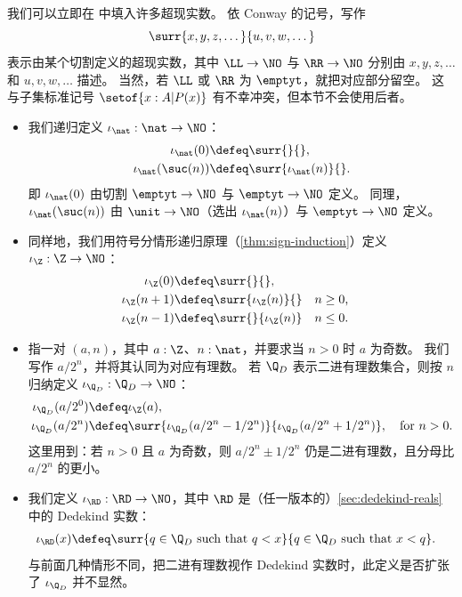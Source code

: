 我们可以立即在 \NO 中填入许多超现实数。
依 Conway 的记号，写作
\[\surr{x,y,z,\dots}{u,v,w,\dots}\]
表示由某个切割定义的超现实数，其中 $\LL\to\NO$ 与 $\RR\to\NO$ 分别由 $x,y,z,\dots$ 和 $u,v,w,\dots$ 描述。
当然，若 $\LL$ 或 $\RR$ 为 $\emptyt$，就把对应部分留空。
这与子集标准记号 $\setof{x:A | P(x)}$ 有不幸冲突，但本节不会使用后者。
\begin{itemize}
\item 我们递归定义 $\iota_{\nat}:\nat\to\NO$：
  \begin{align*}
    \iota_{\nat}(0) &\defeq \surr{}{},\\
    \iota_\nat(\suc(n)) &\defeq \surr{\iota_\nat(n)}{}.
  \end{align*}
  即 $\iota_\nat(0)$ 由切割 $\emptyt\to\NO$ 与 $\emptyt\to\NO$ 定义。
  同理，$\iota_\nat(\suc(n))$ 由 $\unit\to\NO$（选出 $\iota_\nat(n)$）与 $\emptyt\to\NO$ 定义。
\item 同样地，我们用符号分情形递归原理（\cref{thm:sign-induction}）定义 $\iota_{\Z}:\Z\to\NO$：
  \begin{align*}
    \iota_{\Z}(0) &\defeq \surr{}{},\\
    \iota_\Z(n+1) &\defeq \surr{\iota_\Z(n)}{} & &\text{$n\ge 0$,}\\
    \iota_\Z(n-1) &\defeq \surr{}{\iota_\Z(n)} & &\text{$n\le 0$.}
  \end{align*}
\item {}
  指一对 $(a,n)$，其中 $a:\Z$、$n:\nat$，并要求当 $n>0$ 时 $a$ 为奇数。
  我们写作 $a/2^n$，并将其认同为对应有理数。
  若 $\Q_D$ 表示二进有理数集合，则按 $n$ 归纳定义 $\iota_{\Q_D}:\Q_D\to\NO$：
  \begin{align*}
    \iota_{\Q_D}(a/2^0) &\defeq \iota_\Z(a),\\
    \iota_{\Q_D}(a/2^n) &\defeq \surr{\iota_{\Q_D}(a/2^n - 1/2^n)}{\iota_{\Q_D}(a/2^n + 1/2^n)},
    \quad \text{for $n>0$.}
  \end{align*}
  这里用到：若 $n>0$ 且 $a$ 为奇数，则 $a/2^n \pm 1/2^n$ 仍是二进有理数，且分母比 $a/2^n$ 的更小。
\item 我们定义 $\iota_{\RD}:\RD\to\NO$，\label{reals-into-surreals}其中 $\RD$ 是（任一版本的）\cref{sec:dedekind-reals} 中的 Dedekind 实数：
  \begin{align*}
    \iota_{\RD}(x) &\defeq
    \surr{q\in\Q_D \text{ such that } q<x}{q\in\Q_D \text{ such that } x<q}.
  \end{align*}
  与前面几种情形不同，把二进有理数视作 Dedekind 实数时，此定义是否扩张了 $\iota_{\Q_D}$ 并不显然。

\end{itemize}

